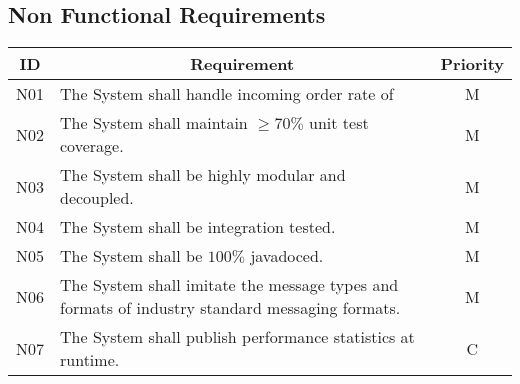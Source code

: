 \subsection{Non Functional Requirements}
\begin{table}[htbp]
\begin{center}
\begin{longtable}{c p{4.2in} c }

\multicolumn{1}{c}{\textbf{ID}}           &
\multicolumn{1}{c}{\textbf{Requirement}}  &
\multicolumn{1}{c}{\textbf{Priority}}     \\        
\toprule

N01  & The System shall handle incoming order rate of              & M \\ 
N02  & The System shall maintain $\geq70\%$ unit test coverage.    & M \\
N03  & The System shall be highly modular and decoupled.           & M \\
N04  & The System shall be integration tested.	                   & M \\
N05  & The System shall be $100\%$ javadoced.	                   & M \\
N06  & The System shall imitate the message types and formats of industry standard messaging formats. & M \\
N07  & The System shall publish performance statistics at runtime. & C \\

         
\end{longtable}
\end{center}
\end{table}

